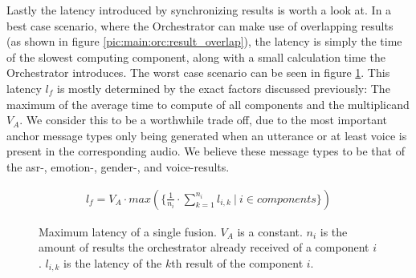 Lastly the latency introduced by synchronizing results is worth a look at.
In a best case scenario, where the Orchestrator can make use of overlapping results (as shown in figure \ref{pic:main:orc:result_overlap}), the latency is simply the time of the slowest computing component, along with a small calculation time the Orchestrator introduces.
The worst case scenario can be seen in figure \ref{main:orc:latency:formula}.
This latency $l_f$ is mostly determined by the exact factors discussed previously: The maximum of the average time to compute of all components and the multiplicand $V_A$. 
We consider this to be a worthwhile trade off, due to the most important anchor message types only being generated when an utterance or at least voice is present in the corresponding audio.
We believe these message types to be that of the \gls{asr}-, emotion-, gender-, and voice-results.

\begin{figure}
	\begin{align}
	l_{f} = V_A \cdot max(\{\frac{1}{n_i} \cdot \sum_{k=1}^{n_i} l_{i,k}\ | \ i \in components\})
	\end{align}
	\caption{Maximum latency of a single fusion.
		$V_A$ is a constant.
		$n_i$ is the amount of results the orchestrator already received of a component $i$.
		$l_{i,k}$ is the latency of the $k$th result of the component $i$.}
	\label{main:orc:latency:formula}
\end{figure}
